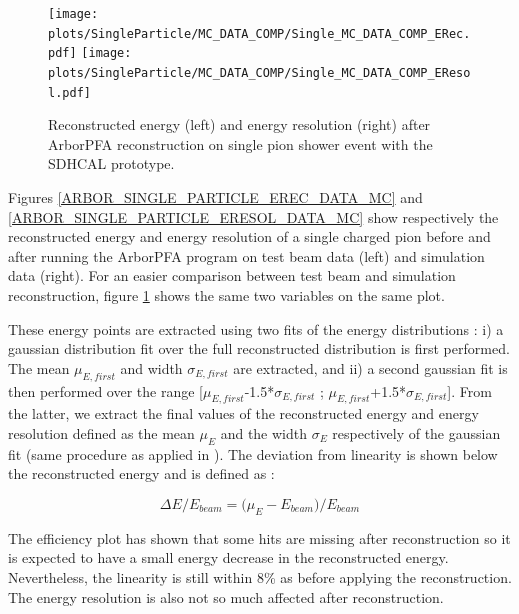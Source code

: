 \documentclass[cits]{JINST}
\begin{document}
\begin{figure}[!h]
  \begin{center}
    \texttt{[image: plots/SingleParticle/MC\_DATA\_COMP/Single\_MC\_DATA\_COMP\_ERec.pdf]}
    \texttt{[image: plots/SingleParticle/MC\_DATA\_COMP/Single\_MC\_DATA\_COMP\_EResol.pdf]} \\
  \end{center}
  \caption{\label{ARBOR_SINGLE_PARTICLE_EREC_AND_ERESOL_COMP} Reconstructed energy (left) and energy resolution (right) after ArborPFA reconstruction on single pion shower event with the SDHCAL prototype.}
\end{figure}

Figures \ref{ARBOR_SINGLE_PARTICLE_EREC_DATA_MC} and \ref{ARBOR_SINGLE_PARTICLE_ERESOL_DATA_MC} show respectively the reconstructed energy and energy resolution of a single charged pion before and after running the ArborPFA program on test beam data (left) and simulation data (right). For an easier comparison between test beam and simulation reconstruction, figure \ref{ARBOR_SINGLE_PARTICLE_EREC_AND_ERESOL_COMP} shows the same two variables on the same plot.

These energy points are extracted using two fits of the energy distributions : i) a gaussian distribution fit over the full reconstructed distribution is first performed. The mean $\mu_{E,first}$ and width $\sigma_{E,first}$ are extracted, and ii) a second gaussian fit is then performed over the range [$\mu_{E,first}$-1.5*$\sigma_{E,first}$ ; $\mu_{E,first}$+1.5*$\sigma_{E,first}$]. From the latter, we extract the final values of the reconstructed energy and energy resolution defined as the mean $\mu_E$ and the width $\sigma_E$ respectively of the gaussian fit (same procedure as applied in \cite{sdhcal-paper}). 
The deviation from linearity is shown below the reconstructed energy and is defined as :

\begin{equation}
  \Delta E/E_{beam} = \Big(\mu_{E} - E_{beam}\Big)/E_{beam}
\end{equation}

The efficiency plot has shown that some hits are missing after reconstruction so it is expected to have a small energy decrease in the reconstructed energy. Nevertheless, the linearity is still within 8\% as before applying the reconstruction. The energy resolution is also not so much affected after reconstruction.

\end{document}
